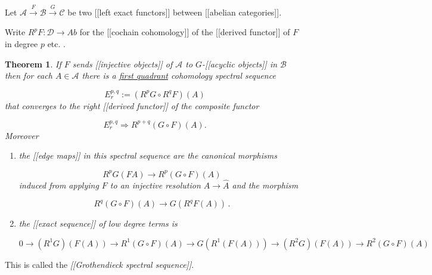 \documentclass[12pt,titlepage]{article}
\theoremstyle{plain}
\newtheorem{theorem}{Theorem}
\theoremstyle{definition}
\theoremstyle{remark}
\begin{document}
Let $\mathcal{A} \stackrel{F}{\to} \mathcal{B} \stackrel{G}{\to} \mathcal{C}$ be two [[left exact functors]] between [[abelian categories]].

Write $R^p F : \mathcal{D} \to Ab$ for the [[cochain cohomology]] of the [[derived functor]] of $F$ in degree $p$ etc. .

\begin{theorem}
\label{GrothendieckSpectralSequence}\hypertarget{}{}
If $F$ sends [[injective objects]] of $\mathcal{A}$ to $G$-[[acyclic objects]] in $\mathcal{B}$ then for each $A \in \mathcal{A}$ there is a \hyperlink{FirstQuadrant}{first quadrant} cohomology spectral sequence

\begin{displaymath}
E_r^{p,q} := (R^p G \circ R^q F)(A)
\end{displaymath}
that converges to the right [[derived functor]] of the composite functor

\begin{displaymath}
E_r^{p,q} \Rightarrow R^{p+q} (G \circ F)(A).
\end{displaymath}
Moreover

\begin{enumerate}%
\item the [[edge maps]] in this spectral sequence are the canonical morphisms

\begin{displaymath}
R^p G (F A) \to R^p (G \circ F)(A)
\end{displaymath}
induced from applying $F$ to an injective resolution $A \to \hat A$ and the morphism

\begin{displaymath}
R^q (G \circ F)(A) \to G(R^q F (A))
  \,.
\end{displaymath}

\item the [[exact sequence]] of low degree terms is

\begin{displaymath}
0 \to (R^1 G)(F(A)) \to R^1(G \circ F)(A)
   \to G(R^1(F(A)))
   \to (R^2 G)(F(A))
   \to R^2(G \circ F)(A)
\end{displaymath}


\end{enumerate}
\end{theorem}
This is called the \emph{[[Grothendieck spectral sequence]]}.
\end{document}
